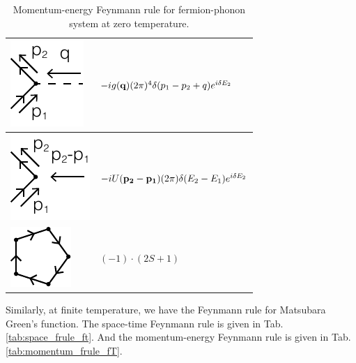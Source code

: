 \documentclass[12pt]{book}
\begin{document}
\begin{table}[htp!]
\begin{tabular}{| >{\centering\arraybackslash}m{15em}|>{\centering\arraybackslash} m{24em}|}
		\hline
		\vspace{2.5ex}\includegraphics[scale=1]{resources/chap_feyn_diag/fdiag_frulep4.pdf}\vspace{1ex}&$-ig({\bf q})(2\pi)^4\delta(p_1-p_2+q)e^{i\delta E_2}$\vspace{0.5ex}\\
		\hline
		\vspace{2.5ex}\includegraphics[scale=1]{resources/chap_feyn_diag/fdiag_frulep5.pdf}\vspace{1ex}&$-iU({\bf p_2}-{\bf p_1})(2\pi)\delta(E_2-E_1)e^{i\delta E_2}$\vspace{0.5ex}\\
		\hline
		\vspace{2.5ex}\includegraphics[scale=1]{resources/chap_feyn_diag/fdiag_frule6.pdf}\vspace{1ex}&$(-1)\cdot(2S+1)$\vspace{0.5ex}\\
		\hline
		\end{tabular}
		\caption{Momentum-energy Feynmann rule for fermion-phonon system at zero temperature.}
		\label{tab:momentum_frule}
	\end{table}
	
	Similarly, at finite temperature, we have the Feynmann rule for Matsubara Green's function. The space-time Feynmann rule is given in Tab. \ref{tab:space_frule_ft}. And the momentum-energy Feynmann rule is given in Tab. \ref{tab:momentum_frule_fT}.
	
\end{document}
